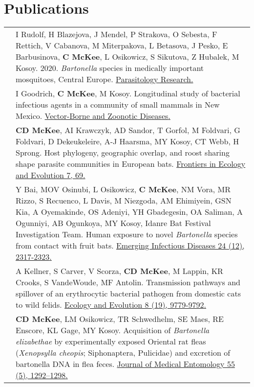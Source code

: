 \documentclass[letterpaper]{deedy-resume} %
\begin{document}
\section{Publications}
\begin{tabular}{>{\raggedright\arraybackslash}p{2cm}p{16cm}}

2020 & I Rudolf, H Blazejova, J Mendel, P Strakova, O Sebesta, F Rettich, V Cabanova, M Miterpakova, L Betasova, J Pesko, E Barbusinova, \textbf{C McKee}, L Osikowicz, S Sikutova, Z Hubalek, M Kosoy. 2020. \textit{Bartonella} species in medically important mosquitoes, Central Europe. \href{https://doi.org/10.1007/s00436-020-06732-1}{\textcolor{special}{Parasitology Research}.}\\

2020 & I Goodrich, \textbf{C McKee}, M Kosoy. Longitudinal study of bacterial infectious agents in a community of small mammals in New Mexico. \href{https://doi.org/10.1089/vbz.2019.2550}{\textcolor{special}{Vector-Borne and Zoonotic Diseases}.}\\

2019 & \textbf{CD McKee}, AI Krawczyk, AD Sandor, T Gorfol, M Foldvari, G Foldvari, D Dekeukeleire, A-J Haarsma, MY Kosoy, CT Webb, H Sprong. Host phylogeny, geographic overlap, and roost sharing shape parasite communities in European bats. \href{https://doi.org/10.3389/fevo.2019.00069}{\textcolor{special}{Frontiers in Ecology and Evolution 7, 69}.}\\

2018 & Y Bai, MOV Osinubi, L Osikowicz, \textbf{C McKee}, NM Vora, MR Rizzo, S Recuenco, L Davis, M Niezgoda, AM Ehimiyein, GSN Kia, A Oyemakinde, OS Adeniyi, YH Gbadegesin, OA Saliman, A Ogunniyi, AB Ogunkoya, MY Kosoy, Idanre Bat Festival Investigation Team. Human exposure to novel \textit{Bartonella} species from contact with fruit bats. \href{https://doi.org/10.3201/eid2412.181204}{\textcolor{special}{Emerging Infectious Diseases 24 (12), 2317-2323}.}\\

2018 & A Kellner, S Carver, V Scorza, \textbf{CD McKee}, M Lappin, KR Crooks, S VandeWoude, MF Antolin. Transmission pathways and spillover of an erythrocytic bacterial pathogen from domestic cats to wild felids. \href{https://doi.org/10.1002/ece3.4451}{\textcolor{special}{Ecology and Evolution 8 (19), 9779-9792}.}\\

2018 & \textbf{CD McKee}, LM Osikowicz, TR Schwedhelm, SE Maes, RE Enscore, KL Gage, MY Kosoy. Acquisition of \textit{Bartonella elizabethae} by experimentally exposed Oriental rat fleas (\textit{Xenopsylla cheopis}; Siphonaptera, Pulicidae) and excretion of bartonella DNA in flea feces. \href{https://doi.org/10.1093/jme/tjy085}{\textcolor{special}{Journal of Medical Entomology 55 (5), 1292–1298}.}\\


\end{tabular}
\end{document}
